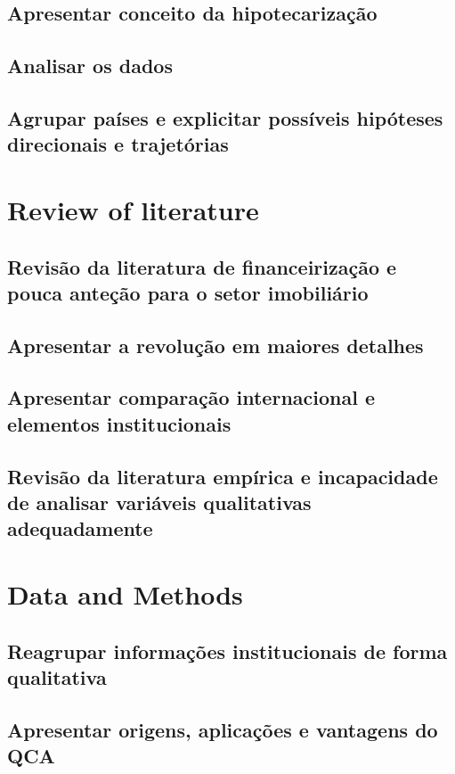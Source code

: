 \documentclass[12pt,openright,oneside,a4paper,english,sumario=tradicional]{gpsabntex}
\numberwithin{listing}{chapter}
\begin{document}
\subsection{Apresentar conceito da hipotecarização}
\label{sec:org75b1661}
\subsection{Analisar os dados}
\label{sec:org937b7b1}
\subsection{Agrupar países e explicitar possíveis hipóteses direcionais e trajetórias}
\label{sec:org5908c61}
\section{Review of literature}
\label{sec:org13efb36}
\subsection{Revisão da literatura de financeirização e pouca anteção para o setor imobiliário}
\label{sec:orgdf73de0}
\subsection{Apresentar a revolução em maiores detalhes}
\label{sec:org14c520f}
\subsection{Apresentar comparação internacional e elementos institucionais}
\label{sec:org942298e}
\subsection{Revisão da literatura empírica e incapacidade de analisar variáveis qualitativas adequadamente}
\label{sec:orge438122}
\section{Data and Methods}
\label{sec:org8e0fdd9}
\subsection{Reagrupar informações institucionais de forma qualitativa}
\label{sec:org0fb21ac}
\subsection{Apresentar origens, aplicações e vantagens do QCA}
\label{sec:org9378e9c}
\end{document}
